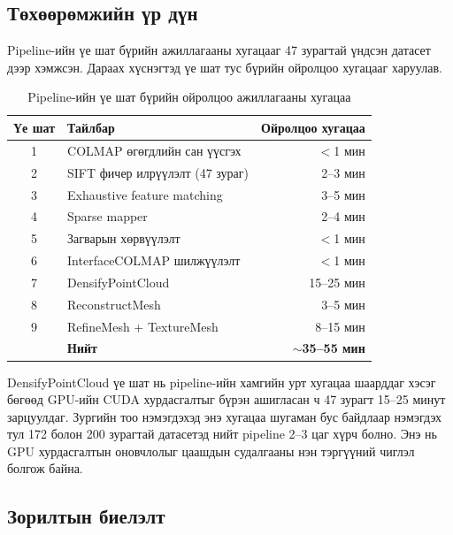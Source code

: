 \subsection{Төхөөрөмжийн үр дүн}

Pipeline-ийн үе шат бүрийн ажиллагааны хугацааг 47 зурагтай үндсэн датасет дээр хэмжсэн. Дараах хүснэгтэд үе шат тус бүрийн ойролцоо хугацааг харуулав.

\begin{table}[H]
\centering
\caption{Pipeline-ийн үе шат бүрийн ойролцоо ажиллагааны хугацаа}
\label{tab:pipeline_timing}
\small
\begin{tabular}{|c|p{6.5cm}|r|}
\hline
\textbf{Үе шат} & \textbf{Тайлбар} & \textbf{Ойролцоо хугацаа} \\ \hline
1 & COLMAP өгөгдлийн сан үүсгэх        & $<$1 мин \\ \hline
2 & SIFT фичер илрүүлэлт (47 зураг)   & 2--3 мин \\ \hline
3 & Exhaustive feature matching         & 3--5 мин \\ \hline
4 & Sparse mapper                        & 2--4 мин \\ \hline
5 & Загварын хөрвүүлэлт                 & $<$1 мин \\ \hline
6 & InterfaceCOLMAP шилжүүлэлт          & $<$1 мин \\ \hline
7 & DensifyPointCloud                    & 15--25 мин \\ \hline
8 & ReconstructMesh                      & 3--5 мин \\ \hline
9 & RefineMesh + TextureMesh             & 8--15 мин \\ \hline
  & \textbf{Нийт}                        & \textbf{$\sim$35--55 мин} \\ \hline
\end{tabular}
\end{table}

DensifyPointCloud үе шат нь pipeline-ийн хамгийн урт хугацаа шаарддаг хэсэг бөгөөд GPU-ийн CUDA хурдасгалтыг бүрэн ашигласан ч 47 зурагт 15--25 минут зарцуулдаг. Зургийн тоо нэмэгдэхэд энэ хугацаа шугаман бус байдлаар нэмэгдэх тул 172 болон 200 зурагтай датасетэд нийт pipeline 2--3 цаг хүрч болно. Энэ нь GPU хурдасгалтын оновчлолыг цаашдын судалгааны нэн тэргүүний чиглэл болгож байна.

\subsection{Зорилтын биелэлт}

